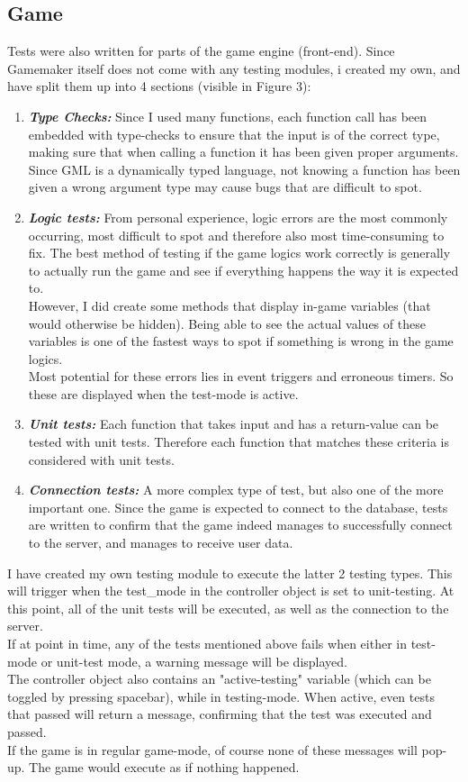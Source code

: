 \documentclass[12pt]{report}
\begin{document}
\subsection*{Game}
Tests were also written for parts of the game engine (front-end). Since Gamemaker itself does not come with any testing modules, i created my own, and have split them up into 4 sections (visible in Figure 3):
\begin{enumerate}
\item \emph{\textbf{Type Checks:}} Since I used many functions, each function call has been embedded with type-checks to ensure that the input is of the correct type, making sure that when calling a function it has been given proper arguments. Since GML is a dynamically typed language, not knowing a function has been given a wrong argument type may cause bugs that are difficult to spot.
\item \emph{\textbf{Logic tests:}} From personal experience, logic errors are the most commonly occurring, most difficult to spot and therefore also most time-consuming to fix. The best method of testing if the game logics work correctly is generally to actually run the game and see if everything happens the way it is expected to.\\
However, I did create some methods that display in-game variables (that would otherwise be hidden). Being able to see the actual values of these variables is one of the fastest ways to spot if something is wrong in the game logics.\\
Most potential for these errors lies in event triggers and erroneous timers. So these are displayed when the test-mode is active.
\item \emph{\textbf{Unit tests:}} Each function that takes input and has a return-value can be tested with unit tests. Therefore each function that matches these criteria is considered with unit tests.
\item \emph{\textbf{Connection tests:}} A more complex type of test, but also one of the more important one. Since the game is expected to connect to the database, tests are written to confirm that the game indeed manages to successfully connect to the server, and manages to receive user data.
\end{enumerate}
I have created my own testing module to execute the latter 2 testing types. This will trigger when the test\_mode in the controller object is set to unit-testing. At this point, all of the unit tests will be executed, as well as the connection to the server.\\
If at point in time, any of the tests mentioned above fails when either in test-mode or unit-test mode, a warning message will be displayed.\\
The controller object also contains an "active-testing" variable (which can be toggled by pressing spacebar), while in testing-mode. When active, even tests that passed will return a message, confirming that the test was executed and passed.\\
If the game is in regular game-mode, of course none of these messages will pop-up. The game would execute as if nothing happened.
\end{document}
